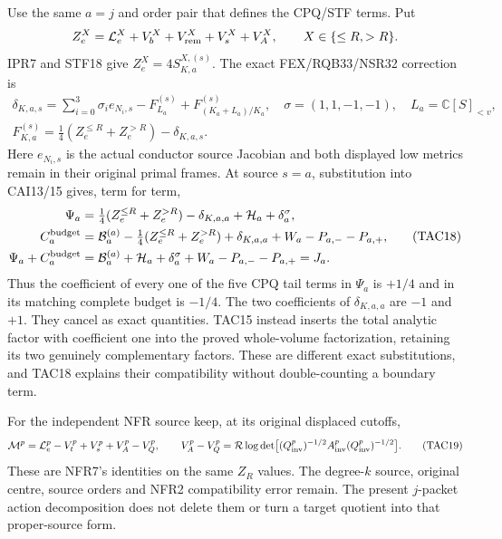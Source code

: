 Use the same $a=j$ and order pair that defines the CPQ/STF terms.  Put
\[
 Z_e^X=\mathcal L_e^X+V_b^X+V_{\rm rem}^X+V_s^X+V_A^X,
 \qquad X\in\{\le R,>R\}.
\]
IPR7 and STF18 give $Z_e^X=4S_{K,a}^{X,(s)}$.  The exact
FEX/RQB33/NSR32 correction is
\[
 \begin{gathered}
 \delta_{K,a,s}=\sum_{i=0}^3\sigma_i e_{N_i,s}
                  -F_{L_a}^{(s)}+F_{(K_a+L_a)/K_a}^{(s)},
 \quad \sigma=(1,1,-1,-1),\quad L_a=\mathbb C[S]_{<v},\\
 F_{K,a}^{(s)}=\tfrac14(Z_e^{\le R}+Z_e^{>R})-\delta_{K,a,s}.
 \end{gathered}
 \tag{TAC17}
\]
Here $e_{N_i,s}$ is the actual conductor source Jacobian and both
displayed low metrics remain in their original primal frames.
At source $s=a$, substitution into CAI13/15 gives, term for term,
\[
 \begin{split}
 \Psi_a&=\tfrac14(Z_e^{\le R}+Z_e^{>R})-\delta_{K,a,a}
                  +\mathcal H_a+\delta_a^\sigma,\\
 C_a^{\rm budget}&=\mathcal B_a^{(a)}
       -\tfrac14(Z_e^{\le R}+Z_e^{>R})+\delta_{K,a,a}
                       +W_a-P_{a,-}-P_{a,+},\\
 \Psi_a+C_a^{\rm budget}
     &=\mathcal B_a^{(a)}+\mathcal H_a+\delta_a^\sigma
                       +W_a-P_{a,-}-P_{a,+}=J_a.
 \end{split}
 \tag{TAC18}
\]
Thus the coefficient of every one of the five CPQ tail terms in
$\Psi_a$ is $+1/4$ and in its matching complete budget is $-1/4$.
The two coefficients of $\delta_{K,a,a}$ are $-1$ and $+1$.
They cancel as exact quantities.  TAC15 instead inserts the total
analytic factor with coefficient one into the proved whole-volume
factorization, retaining its two genuinely complementary factors.
These are different exact substitutions, and TAC18 explains their
compatibility without double-counting a boundary term.

For the independent NFR source keep, at its original displaced cutoffs,
\[
 \mathcal M^p=\mathcal L_e^p-V_t^p+V_s^p+V_A^p-V_Q^p,
 \qquad V_A^p-V_Q^p
   =\mathcal R\log\det\bigl[(Q_{\rm inv}^p)^{-1/2}
                A_{\rm inv}^p(Q_{\rm inv}^p)^{-1/2}\bigr].
 \tag{TAC19}
\]
These are NFR7's identities on the same $Z_R$ values.  The degree-$k$
source, original centre, source orders and NFR2 compatibility error
remain.  The present $j$-packet action decomposition does not delete
them or turn a target quotient into that proper-source form.

